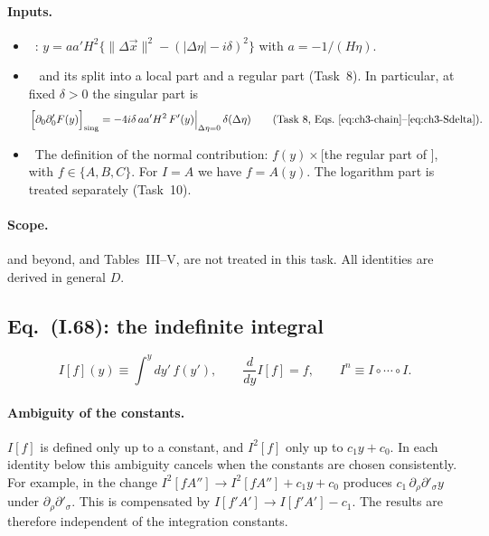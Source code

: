 \paragraph{Inputs.}
\begin{itemize}[leftmargin=14pt]
\item[(G1)] \tP\ : $y=aa'H^2\big\{\|\Delta\vec x\|^2-(|\Delta\eta|-i\delta)^2\big\}$ with $a=-1/(H\eta)$.
\item[(G2)] \tD\  and its split into a local part and a regular part (Task~8). In particular, at fixed $\delta>0$ the singular part is
\begin{equation}
\Big[\partial_0\partial'_0F(y)\Big]_{\rm sing}=-4i\delta\,aa'H^2\,F'(y)\Big|_{\Delta\eta=0}\,\delta(\Delta\eta)
\qquad\text{(Task 8, Eqs.\ \eqref{eq:ch3-chain}--\eqref{eq:ch3-Sdelta})}.
\label{eq:ch05:t11:sing}
\end{equation}
\item[(G3)] \tP\ The definition  of the normal contribution: $f(y)\times$[the regular part of ], with $f\in\{A,B,C\}$.
For $I=A$ we have $f=A(y)$. The logarithm part is treated separately (Task~10).
\end{itemize}

\paragraph{Scope.}
 and beyond, and Tables~III--V, are not treated in this task. All identities are derived in general $D$.

\subsection[Eq. (I.68): the indefinite integral]{Eq.~(I.68): the indefinite integral \tA}

\begin{equation}
I[f](y)\equiv\int^y dy'\,f(y'),\qquad \frac{d}{dy}I[f]=f,\qquad I^n\equiv I\circ\cdots\circ I .
\tag{I.68}\label{eq:ch05:I68}
\end{equation}
\paragraph{Ambiguity of the constants.}
$I[f]$ is defined only up to a constant, and $I^2[f]$ only up to $c_1y+c_0$. In each identity below this ambiguity cancels when the constants are chosen consistently.
For example, in  the change $I^2[fA'']\to I^2[fA'']+c_1y+c_0$ produces $c_1\,\partial_\rho\partial'_\sigma y$ under $\partial_\rho\partial'_\sigma$.
This is compensated by $I[f'A']\to I[f'A']-c_1$. The results are therefore independent of the integration constants.

